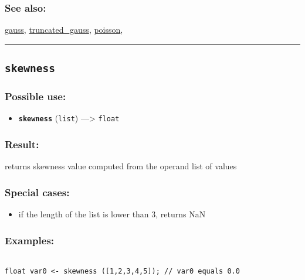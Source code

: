 \documentclass[]{book}
\providecommand{\tightlist}{%
  \setlength{\itemsep}{0pt}\setlength{\parskip}{0pt}}
\theoremstyle{definition}
\theoremstyle{definition}
\theoremstyle{definition}
\theoremstyle{remark}
\begin{document}
\subsubsection{See also:}\label{see-also-187}

\href{OperatorsDH\#gauss}{gauss},
\href{OperatorsSZ\#truncated_gauss}{truncated\_gauss},
\href{OperatorsNR\#poisson}{poisson},

\begin{center}\rule{0.5\linewidth}{\linethickness}\end{center}

\subsection{\texorpdfstring{\texttt{skewness}}{skewness}}\label{skewness}

\subsubsection{Possible use:}\label{possible-use-482}

\begin{itemize}
\tightlist
\item
  \textbf{\texttt{skewness}} (\texttt{list}) ---\textgreater{}
  \texttt{float}
\end{itemize}

\subsubsection{Result:}\label{result-466}

returns skewness value computed from the operand list of values

\subsubsection{Special cases:}\label{special-cases-123}

\begin{itemize}
\tightlist
\item
  if the length of the list is lower than 3, returns NaN
\end{itemize}

\subsubsection{Examples:}\label{examples-337}

\begin{verbatim}
 
float var0 <- skewness ([1,2,3,4,5]); // var0 equals 0.0
\end{verbatim}
\end{document}
